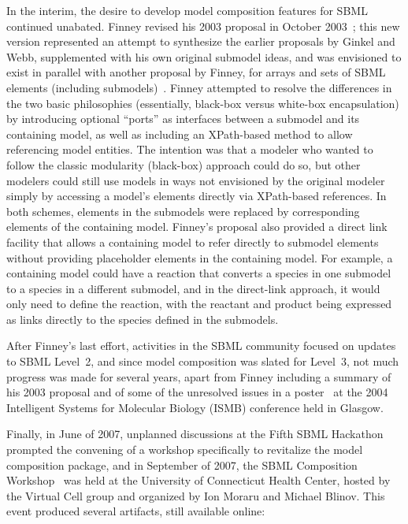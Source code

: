 In the interim, the desire to develop model composition features for
SBML continued unabated.  Finney revised his 2003 proposal in October
2003~\cite{x}; this new version represented an attempt to synthesize the
earlier proposals by Ginkel and Webb, supplemented with his own original
submodel ideas, and was envisioned to exist in parallel with another
proposal by Finney, for arrays and sets of SBML elements (including
submodels)~\cite{x}.  Finney attempted to resolve the differences in the
two basic philosophies (essentially, black-box versus white-box
encapsulation) by introducing optional ``ports'' as interfaces between a
submodel and its containing model, as well as including an XPath-based
method to allow referencing model entities.  The intention was that a
modeler who wanted to follow the classic modularity (black-box) approach
could do so, but other modelers could still use models in ways not
envisioned by the original modeler simply by accessing a model's
elements directly via XPath-based references.  In both schemes, elements
in the submodels were replaced by corresponding elements of the
containing model.  Finney's proposal also provided a direct link
facility that allows a containing model to refer directly to submodel
elements without providing placeholder elements in the containing
model.  For example, a containing model could have a reaction that
converts a species in one submodel to a species in a different submodel,
and in the direct-link approach, it would only need to define the
reaction, with the reactant and product being expressed as links
directly to the species defined in the submodels.

After Finney's last effort, activities in the SBML community focused on
updates to SBML Level~2, and since model composition was slated for
Level~3, not much progress was made for several years, apart from Finney
including a summary of his 2003 proposal and of some of the unresolved
issues in a poster~\cite{x} at the 2004 Intelligent Systems for Molecular
Biology (ISMB) conference held in Glasgow.

Finally, in June of 2007, unplanned discussions at the Fifth SBML
Hackathon~\cite{x} prompted the convening of a workshop specifically to
revitalize the model composition package, and in September of 2007, the
SBML Composition Workshop~\cite{x} was held at the University of
Connecticut Health Center, hosted by the Virtual Cell group and
organized by Ion Moraru and Michael Blinov.  This event produced several
artifacts, still available online:

